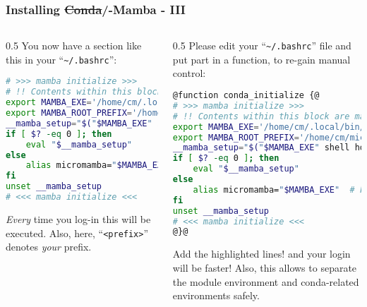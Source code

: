 \begin{frame}[fragile]
  \frametitle{Installing \sout{Conda}/\textmu-Mamba - III}
  \footnotesize
  \begin{columns}[t]
    \begin{column}{0.5\textwidth}
       You now have a section like this in your ``\texttt{\textasciitilde/.bashrc}'':
       \begin{lstlisting}[language=Bash, style=Shell, basicstyle=\tiny, breaklines=true]
# >>> mamba initialize >>>
# !! Contents within this block are managed by 'mamba init' !!
export MAMBA_EXE='/home/cm/.local/bin/micromamba';
export MAMBA_ROOT_PREFIX='/home/cm/micromamba';
__mamba_setup="$("$MAMBA_EXE" shell hook --shell bash --root-prefix "$MAMBA_ROOT_PREFIX" 2> /dev/null)"
if [ $? -eq 0 ]; then
    eval "$__mamba_setup"
else
    alias micromamba="$MAMBA_EXE"  # Fallback on help from mamba activate
fi
unset __mamba_setup
# <<< mamba initialize <<<
      \end{lstlisting}
      \bcattention \emph{Every} time you log-in this will be executed. Also, here, ``\texttt{<prefix>}'' denotes \emph{your} prefix.
    \end{column}
    \begin{column}{0.5\textwidth}
       \pause
       Please edit your ``\texttt{\textasciitilde/.bashrc}'' file and put part in a function, to re-gain manual control:
       \begin{lstlisting}[language=Bash, style=Shell, basicstyle=\tiny, breaklines=true]
@function conda_initialize {@
# >>> mamba initialize >>>
# !! Contents within this block are managed by 'mamba init' !!
export MAMBA_EXE='/home/cm/.local/bin/micromamba';
export MAMBA_ROOT_PREFIX='/home/cm/micromamba';
__mamba_setup="$("$MAMBA_EXE" shell hook --shell bash --root-prefix "$MAMBA_ROOT_PREFIX" 2> /dev/null)"
if [ $? -eq 0 ]; then
    eval "$__mamba_setup"
else
    alias micromamba="$MAMBA_EXE"  # Fallback on help from mamba activate
fi
unset __mamba_setup
# <<< mamba initialize <<<
@}@
      \end{lstlisting}
      \bcattention Add the highlighted lines! and your login will be faster! Also, this allows to separate the module environment and conda-related environments safely.
    \end{column}
  \end{columns}
\end{frame}



